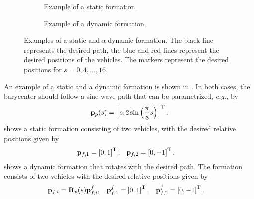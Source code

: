 \begin{figure}[t]
    \centering
    \begin{subfigure}{0.48\textwidth}
        \centering
                
        \vspace*{-1.75em}
        \caption{Example of a static formation.}
        \label{fig:background_formation_static}
    \end{subfigure}
    \begin{subfigure}{0.48\textwidth}
        \centering
                
        \vspace*{-1.75em}
        \caption{Example of a dynamic formation.}
        \label{fig:background_formation_dynamic}
    \end{subfigure}
    \vspace*{-0.5em}
    \caption{Examples of a static and a dynamic formation. The black line represents the desired path, the blue and red lines represent the desired positions of the vehicles. The markers represent the desired positions for $s = 0, 4, \ldots, 16$.}
    \label{fig:background_formation}
\end{figure}

An example of a static and a dynamic formation is shown in .
In both cases, the barycenter should follow a sine-wave path that can be parametrized, \emph{e.g.,} by
\begin{equation}
    \mathbf{p}_p(s) = \left[s, 2 \sin\left(\frac{\pi}{8} s\right)\right]^{\mathrm{T}}.
\end{equation}
 shows a static formation consisting of two vehicles, with the desired relative positions given by
\begin{align}
    \mathbf{p}_{f,1} &= \left[0, 1\right]^{\mathrm{T}}, &
    \mathbf{p}_{f,2} &= \left[0, -1\right]^{\mathrm{T}}.
\end{align}
 shows a dynamic formation that rotates with the desired path.
The formation consists of two vehicles with the desired relative positions given by
\begin{align}
    \mathbf{p}_{f, i} &= \mathbf{R}_p(s) \mathbf{p}_{f, i}^f, &
    \mathbf{p}_{f,1}^f &= \left[0, 1\right]^{\mathrm{T}}, &
    \mathbf{p}_{f,2}^f &= \left[0, -1\right]^{\mathrm{T}}.
\end{align}

